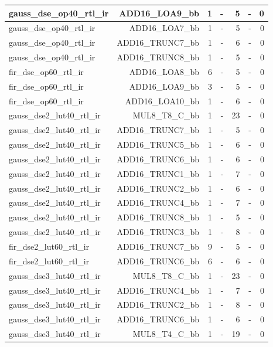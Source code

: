 \begin{table}[htbp]
\begin{tabular}{|l|r|r|r|r|r|r|}
gauss\_dse\_op40\_rtl\_ir & ADD16\_LOA9\_bb & 1 & - & 5 & - & 0 \\ \hline
gauss\_dse\_op40\_rtl\_ir & ADD16\_LOA7\_bb & 1 & - & 5 & - & 0 \\ \hline
gauss\_dse\_op40\_rtl\_ir & ADD16\_TRUNC7\_bb & 1 & - & 6 & - & 0 \\ \hline
gauss\_dse\_op40\_rtl\_ir & ADD16\_TRUNC8\_bb & 1 & - & 5 & - & 0 \\ \hline
fir\_dse\_op60\_rtl\_ir & ADD16\_LOA8\_bb & 6 & - & 5 & - & 0 \\ \hline
fir\_dse\_op60\_rtl\_ir & ADD16\_LOA9\_bb & 3 & - & 5 & - & 0 \\ \hline
fir\_dse\_op60\_rtl\_ir & ADD16\_LOA10\_bb & 1 & - & 6 & - & 0 \\ \hline
gauss\_dse2\_lut40\_rtl\_ir & MUL8\_T8\_C\_bb & 1 & - & 23 & - & 0 \\ \hline
gauss\_dse2\_lut40\_rtl\_ir & ADD16\_TRUNC7\_bb & 1 & - & 5 & - & 0 \\ \hline
gauss\_dse2\_lut40\_rtl\_ir & ADD16\_TRUNC5\_bb & 1 & - & 6 & - & 0 \\ \hline
gauss\_dse2\_lut40\_rtl\_ir & ADD16\_TRUNC6\_bb & 1 & - & 6 & - & 0 \\ \hline
gauss\_dse2\_lut40\_rtl\_ir & ADD16\_TRUNC1\_bb & 1 & - & 7 & - & 0 \\ \hline
gauss\_dse2\_lut40\_rtl\_ir & ADD16\_TRUNC2\_bb & 1 & - & 6 & - & 0 \\ \hline
gauss\_dse2\_lut40\_rtl\_ir & ADD16\_TRUNC4\_bb & 1 & - & 7 & - & 0 \\ \hline
gauss\_dse2\_lut40\_rtl\_ir & ADD16\_TRUNC8\_bb & 1 & - & 5 & - & 0 \\ \hline
gauss\_dse2\_lut40\_rtl\_ir & ADD16\_TRUNC3\_bb & 1 & - & 8 & - & 0 \\ \hline
fir\_dse2\_lut60\_rtl\_ir & ADD16\_TRUNC7\_bb & 9 & - & 5 & - & 0 \\ \hline
fir\_dse2\_lut60\_rtl\_ir & ADD16\_TRUNC6\_bb & 6 & - & 6 & - & 0 \\ \hline
gauss\_dse3\_lut40\_rtl\_ir & MUL8\_T8\_C\_bb & 1 & - & 23 & - & 0 \\ \hline
gauss\_dse3\_lut40\_rtl\_ir & ADD16\_TRUNC4\_bb & 1 & - & 7 & - & 0 \\ \hline
gauss\_dse3\_lut40\_rtl\_ir & ADD16\_TRUNC2\_bb & 1 & - & 8 & - & 0 \\ \hline
gauss\_dse3\_lut40\_rtl\_ir & ADD16\_TRUNC6\_bb & 1 & - & 6 & - & 0 \\ \hline
gauss\_dse3\_lut40\_rtl\_ir & MUL8\_T4\_C\_bb & 1 & - & 19 & - & 0 \\ \hline

\end{tabular}
\end{table}
